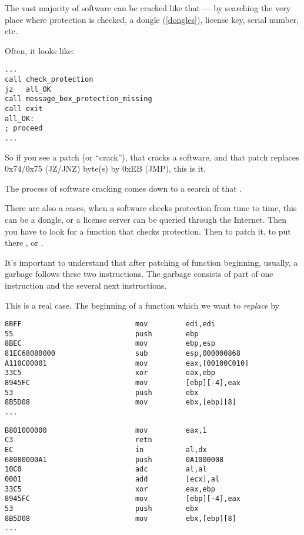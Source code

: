 \label{\SoftwareCracking}

The vast majority of software can be cracked like that --- by searching the very place where protection is checked, a dongle
(\ref{dongles}), license key, serial number, etc.

Often, it looks like:

\begin{lstlisting}[style=customasmx86]
...
call check_protection
jz   all_OK
call message_box_protection_missing
call exit
all_OK:
; proceed
...
\end{lstlisting}

So if you see a patch (or ``crack''), that cracks a software, and that patch replaces 0x74/0x75 (JZ/JNZ) byte(s) by 0xEB (JMP),
this is it.

The process of software cracking comes down to a search of that .

\myhrule{}

There are also a cases, when a software checks protection from time to time, this can be a dongle, or a license server
can be queried through the Internet.
Then you have to look for a function that checks protection.
Then to patch it, to put there , or .

It's important to understand that after patching of function beginning, usually, a garbage follows these two instructions.
The garbage consists of part of one instruction and the several next instructions.

This is a real case.
The beginning of a function which we want to \emph{replace} by 

\begin{lstlisting}[style=customasmx86,caption=Before]
8BFF                           mov         edi,edi
55                             push        ebp
8BEC                           mov         ebp,esp
81EC68080000                   sub         esp,000000868
A110C00001                     mov         eax,[00100C010]
33C5                           xor         eax,ebp
8945FC                         mov         [ebp][-4],eax
53                             push        ebx
8B5D08                         mov         ebx,[ebp][8]
...
\end{lstlisting}

\begin{lstlisting}[style=customasmx86,caption=After]
B801000000                     mov         eax,1
C3                             retn
EC                             in          al,dx
68080000A1                     push        0A1000008
10C0                           adc         al,al
0001                           add         [ecx],al
33C5                           xor         eax,ebp
8945FC                         mov         [ebp][-4],eax
53                             push        ebx
8B5D08                         mov         ebx,[ebp][8]
...
\end{lstlisting}

